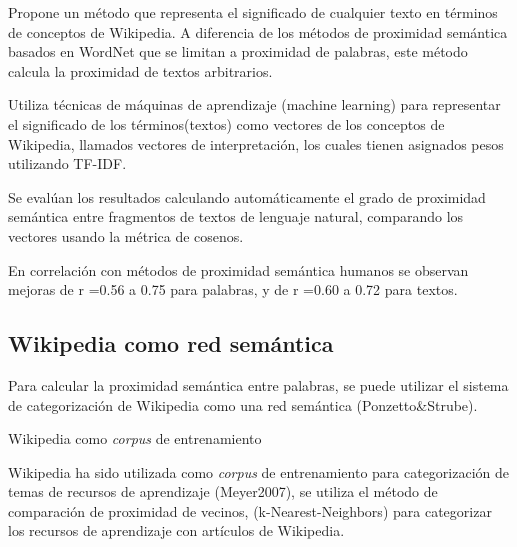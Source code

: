 \documentclass[letterpaper]{article}
\newcommand\textstylebibuscitbase[1]{#1}
\begin{document}
{\sffamily
Propone un m\'etodo que representa el significado de cualquier texto en
t\'erminos de conceptos de Wikipedia. A diferencia de los m\'etodos de
proximidad sem\'antica basados en WordNet que se limitan a proximidad
de palabras, este m\'etodo calcula la proximidad de textos
arbitrarios.}


\bigskip

{\sffamily
Utiliza t\'ecnicas de m\'aquinas de aprendizaje (machine learning) para
representar el significado de los t\'erminos(textos) como vectores de
los conceptos de Wikipedia, llamados vectores de interpretaci\'on, los
cuales tienen asignados pesos utilizando TF-IDF.}


\bigskip

{\sffamily
Se eval\'uan los resultados calculando autom\'aticamente el grado de
proximidad sem\'antica entre fragmentos de textos de lenguaje natural,
comparando los vectores usando la m\'etrica de cosenos.}


\bigskip

{\sffamily
En correlaci\'on con m\'etodos de proximidad sem\'antica humanos se
observan mejoras de r =0.56 a 0.75 para palabras, y de r =0.60 a 0.72
para textos.}


\bigskip

\subsection[Wikipedia como red sem\'antica]{Wikipedia como red
sem\'antica}
\hypertarget{RefHeading10790782078703}{}
\bigskip

{\sffamily
\foreignlanguage{spanish}{Para calcular la proximidad sem\'antica entre
palabras, se puede utilizar el sistema de categorizaci\'on de Wikipedia
como una red sem\'antica
}\textstylebibuscitbase{\foreignlanguage{spanish}{(Ponzetto\&Strube)}}\foreignlanguage{spanish}{.}}

{\sffamily
Wikipedia como \textit{corpus} de entrenamiento}


\bigskip

{\sffamily
Wikipedia ha sido utilizada como \textit{corpus} de entrenamiento para
categorizaci\'on de temas de recursos de aprendizaje
\textstylebibuscitbase{(Meyer2007)}, se utiliza el m\'etodo de
comparaci\'on de proximidad de vecinos, (k-Nearest-Neighbors)%
 para categorizar los recursos de aprendizaje con art\'iculos de
Wikipedia.}
\end{document}
